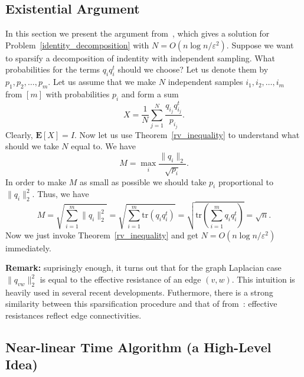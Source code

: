 \documentclass[12pt]{article}
\newcommand{\eps}{\varepsilon}
\begin{document}
    \subsection{Existential Argument}

    In this section we present the argument from~\cite{SS11}, which gives a solution
    for Problem~\ref{identity_decomposition} with $N = O(n \log n / \eps^2)$.
    Suppose we want to sparsify a decomposition of indentity with independent sampling.
    What probabilities for the terms $q_i q_i^t$ should we choose?
    Let us denote them by $p_1, p_2, \ldots, p_m$.
    Let us assume that we make $N$ independent samples $i_1, i_2, \ldots, i_m$
    from $[m]$ with probabilities $p_i$ and form a sum
    $$
        X = \frac{1}{N} \sum_{j=1}^N \frac{q_{i_j} q_{i_j}^t}{p_{i_j}}.
    $$
    Clearly, $\mathbf{E}[X] = I$. Now let us use Theorem~\ref{rv_inequality} to understand
    what should we take $N$ equal to. We have
    $$
        M = \max_i \frac{\|q_i\|_2}{\sqrt{p_i}}.
    $$
    In order to make $M$ as small as possible we should take $p_i$ proportional to
    $\|q_i\|_2^2$. Thus, we have
    $$
        M = \sqrt{\sum_{i=1}^m \|q_i\|_2^2} =
        \sqrt{\sum_{i=1}^m \mathrm{tr}(q_i q_i^t)} =
        \sqrt{\mathrm{tr}\left(\sum_{i=1}^m q_i q_i^t\right)} = \sqrt{n}.
    $$
    Now we just invoke Theorem~\ref{rv_inequality} and get $N = O(n \log n / \eps^2)$
    immediately.

    \textbf{Remark:} suprisingly enough, it turns out that for the graph Laplacian case
    $\|q_{vw}\|_2^2$ is equal to the effective resistance of an edge $(v, w)$.
    This intuition is heavily used in several recent developments. Futhermore, there is a strong similarity between this
    sparsification procedure and that of from~\cite{BK96}: effective resistances reflect edge connectivities.

    \subsection{Near-linear Time Algorithm (a High-Level Idea)}
\end{document}
